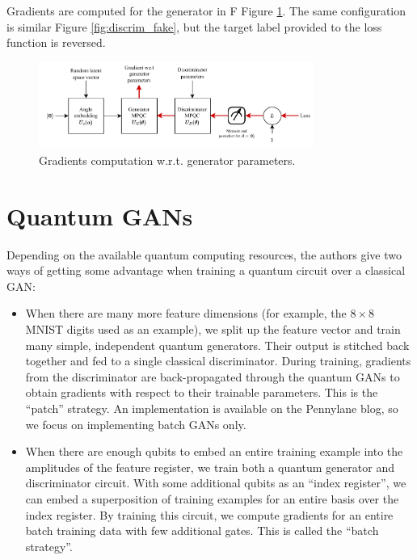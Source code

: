 Gradients are computed for the generator in F
Figure \ref{fig:gen_fake}.  The same configuration is similar Figure \ref{fig:discrim_fake}, but the target label provided to the loss function is reversed.

\begin{figure}[H]
    \centering
    \includegraphics[width=0.8\textwidth]{figures/gen_fake.pdf}
    \caption{Gradients computation w.r.t. generator parameters.}
    \label{fig:gen_fake}
\end{figure}


\section{Quantum GANs}

Depending on the available quantum computing resources, the authors give two ways of 
getting some advantage when training a quantum circuit over a classical GAN:

\begin{itemize}
    \item When there are many more feature dimensions (for example, the $8\times 8$ MNIST digits used 
    as an example), we split up the feature vector and train many simple, independent quantum generators.
    Their output is stitched back together and fed to a single classical discriminator.  During training,
    gradients from the discriminator are back-propagated through the quantum GANs to obtain gradients with
    respect to their trainable parameters.  This is the ``patch'' strategy.  An implementation is available
    on the Pennylane blog\autocite{ellis2022quantum}, so we focus on implementing batch GANs only.

    \item When there are enough qubits to embed an entire training example into the amplitudes of the feature
    register, we train both a quantum generator and discriminator circuit.   With some additional qubits as an
    ``index register'', we can embed a superposition of training examples for an entire basis over the
    index register.  By training this circuit, we compute gradients for an entire batch training data
    with few additional gates.  This is called the ``batch strategy''.
\end{itemize}

